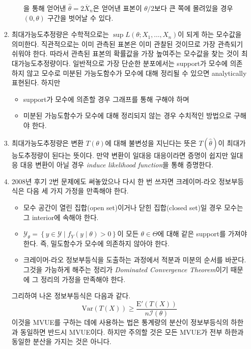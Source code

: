\documentclass[answers]{exam}
\begin{document}
\begin{questions}
\begin{solution}
\begin{enumerate}
\begin{itemize}
$$      $$
      을 통해 얻어낸 $\widehat{\theta}=2\overline{X}_{n}$은 얻어낸 표본이 $\theta/2$보다 큰 쪽에 몰려있을 경우 $(0,\theta)$ 구간을 벗어날 수 있다.
      \end{itemize}
      \item 최대가능도추정량은 수학적으로는 $\sup L\left(\theta;X_{1},\ldots,X_{n}\right)$이 되게 하는 모수값을 의미한다. 직관적으로는 이미 관측된 표본은 이미 관찰된 것이므로 가장 관측되기 쉬워야 한다. 따라서 관측된 표본의 확률값을 가장 높여주는 모수값을 찾는 것이 최대가능도추정량이다. 일반적으로 가장 단순한 분포에서는 support가 모수에 의존하지 않고 모수로 미분된 가능도함수가 모수에 대해 정리될 수 있으면 analytically 표현된다. 하지만
      \begin{itemize}
        \item support가 모수에 의존할 경우 그래프를 통해 구해야 하며
        \item 미분된 가능도함수가 모수에 대해 정리되지 않는 경우 수치적인 방법으로 구해야 한다. 
      \end{itemize}
      \item 최대가능도추정량은 변환 $T\left(\theta\right)$에 대해 불변성을 지닌다는 뜻은 $T\left(\widehat{\theta}\right)$이 최대가능도추정량이 된다는 뜻이다. 만약 변환이 일대응 대응이라면 증명이 쉽지만 일대응 대응 변환이 아닐 경우 \emph{induce likelihood function}을 통해 증명한다.
      \item 2008년 후기 2번 문제에도 써놓았으나 다시 한 번 쓰자면 크레이머-라오 정보부등식은 다음 세 가지 가정을 만족해야 한다.
      \begin{itemize}
        \item 모수 공간이 열린 집합(open set)이거나 닫힌 집합(closed set)일 경우 모수는 그 interior에 속해야 한다.
        \item $\mathcal{Y}_{\theta}=\left\{y\in\mathcal{Y}\;|\;f_{Y}\left(y\;|\;\theta\right)>0 \right\} $이 모든 $\theta\in\Theta$에 대해 같은 support를 가져야 한다. 즉, 밀도함수가 모수에 의존하지 않아야 한다.
        \item 크레이머-라오 정보부등식을 도출하는 과정에서 적분과 미분의 순서를 바꾼다. 그것을 가능하게 해주는 정리가 \emph{Dominated Convergence Theorem}이기 때문에 그 정리의 가정을 만족해야 한다.
      \end{itemize}
      그리하여 나온 정보부등식은 다음과 같다.
      $$
        \mathrm{Var}\left(T\left(X\right)\right) \geq \dfrac{\mathrm{E}'\left(T\left(X\right)\right)}{n\mathcal{I}\left(\theta\right)}
      $$
      이것을 MVUE를 구하는 데에 사용하는 법은 통계량의 분산이 정보부등식의 하한과 동일하면 반드시 MVUE이다. 하지만 주의할 것은 모든 MVUE가 전부 하한과 동일한 분산을 가지는 것은 아니다.

\end{enumerate}
\end{solution}
\end{questions}
\end{document}

